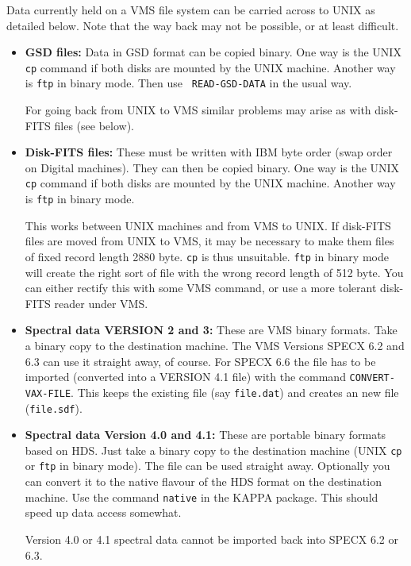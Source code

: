 \documentclass[twoside,11pt]{article}
\newcommand{\xref}[3]{#1}
\renewcommand{\_}{\texttt{\symbol{95}}}
\begin{document}
Data currently held on a VMS file system can be carried across to UNIX
as detailed below. Note that the way back may not be possible, or at
least difficult.
\begin{itemize}
\item {\bf GSD files:}
    Data in \xref{GSD}{sun229}{} format can be copied binary. One way is the
    UNIX {\tt cp} command if both disks are mounted by the UNIX machine.
    Another way is {\tt ftp} in binary mode. Then use {\tt
    READ-GSD-DATA} in the usual way.

    For going back from UNIX to VMS similar problems may arise as with
    disk-FITS files (see below).

\item {\bf Disk-FITS files:}
    These must be written with IBM byte order (swap order
    on Digital machines). They can then be copied binary. One way is the
    UNIX {\tt cp} command if both disks are mounted by the UNIX machine.
    Another way is {\tt ftp} in binary mode.

    This works between UNIX machines and from VMS to UNIX. If disk-FITS
    files are moved from UNIX to VMS, it may be necessary to make them
    files of fixed record length 2880 byte. {\tt cp} is thus unsuitable.
    {\tt ftp} in binary mode will create the right sort of file with the
    wrong record length of 512 byte. You can either rectify this with
    some VMS command, or use a more tolerant disk-FITS reader under VMS.

\item {\bf Spectral data VERSION 2 and 3:}
    These are VMS binary formats. Take a
    binary copy to the destination machine. The VMS Versions SPECX 6.2
    and 6.3 can use it straight away, of course. For SPECX 6.6 the file
    has to be imported (converted into a VERSION 4.1 file) with the
    command {\tt CONVERT-VAX-FILE}. This keeps the existing file (say
    {\tt file.dat}) and creates an new file ({\tt file.sdf}).

\item {\bf Spectral data Version 4.0 and 4.1:}
    These are portable binary formats
    based on HDS. Just take a binary copy to the destination machine
    (UNIX {\tt cp} or {\tt ftp} in binary mode). The file can be used straight
    away. Optionally you can convert it to the native flavour of the HDS
    format on the destination machine. Use the command {\tt native} in the
    KAPPA package. This should speed up data access somewhat.

    Version 4.0 or 4.1 spectral data cannot be imported back into SPECX
    6.2 or 6.3.


\end{itemize}
\end{document}

